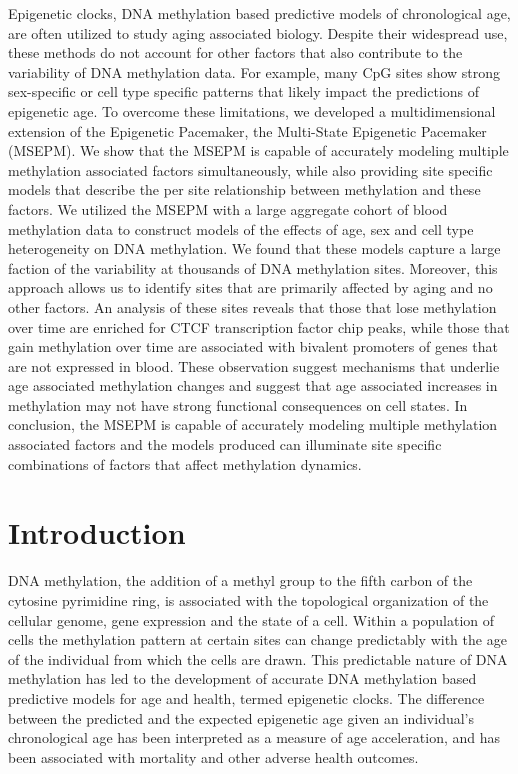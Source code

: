 \documentclass[sn-nature]{sn-jnl}
\begin{document}
{\begin{linenumbers}
Epigenetic clocks, DNA methylation based predictive models of chronological age, are often utilized to study aging associated biology. 
Despite their widespread use, these methods do not account for other factors that also contribute to the variability of DNA methylation data.
 For example, many CpG sites show strong sex-specific or cell type specific patterns that likely impact the predictions of epigenetic age.  
 To overcome these limitations, we developed a multidimensional extension of the Epigenetic Pacemaker, the Multi-State Epigenetic Pacemaker (MSEPM). 
 We show that the MSEPM is capable of accurately modeling multiple methylation associated factors simultaneously, while also providing site specific 
 models that describe the per site relationship between methylation and these factors. We utilized the MSEPM with a large aggregate cohort of blood
  methylation data to construct models of the effects of age, sex and cell type heterogeneity on DNA methylation.  We found that these models 
  capture a large faction of the variability at thousands of DNA methylation sites.  Moreover, this approach allows us to identify sites that 
  are primarily affected by aging and no other factors.  An analysis of these sites reveals that those that lose methylation over time are 
  enriched for CTCF transcription factor chip peaks, while those that gain methylation over time are associated with bivalent promoters of 
  genes that are not expressed in blood. These observation suggest mechanisms that underlie age associated methylation changes and suggest 
  that age associated increases in methylation may not have strong functional consequences on cell states. In conclusion, the MSEPM is 
  capable of accurately modeling multiple methylation associated factors and the models produced can illuminate site specific 
  combinations of factors that affect methylation dynamics.


\section{Introduction}\label{sec1}

DNA methylation, the addition of a methyl group to the fifth carbon of the cytosine pyrimidine ring,  is associated with 
the topological organization of the cellular genome, gene expression and the state of a cell. Within a population of cells 
the methylation pattern at certain sites can change predictably with the age of the individual from which the cells are 
drawn. This predictable nature of DNA methylation has led to the development of accurate DNA methylation based predictive 
models for age and health, termed epigenetic clocks. The difference between the predicted and the expected epigenetic 
age given an individual’s chronological age has been interpreted as a measure of age acceleration\cite{Horvath2018-ia}, 
and has been associated with mortality\cite{Perna2016-pi,Marioni2015-sn} and other adverse health 
outcomes\cite{Dugue2018-ad,Huang2019-hf,Armstrong2017-vg,Chuang2017-nk,Horvath2015-af}. 


\end{linenumbers}}
\end{document}
